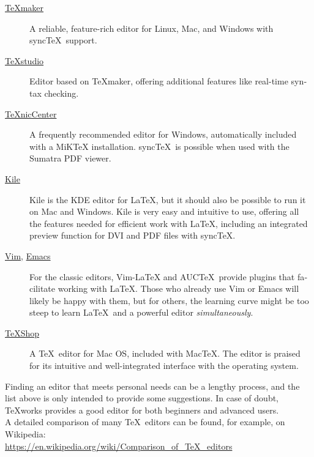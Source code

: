 \documentclass[
	ausgabe=2024-02-12,
	titel=Installation\ Instructions,
	shortverb=true,
	englisch=true,
]{../tex/latexkurs-exercise}
\begin{document}
\begin{english}
\begin{description}
\item[\href{https://www.xm1math.net/texmaker/}{TeXmaker}]
A reliable, feature-rich editor for Linux, Mac, and Windows with sync\TeX\ support.

\item[\href{https://www.texstudio.org/}{TeXstudio}]
Editor based on TeXmaker, offering additional features like real-time syntax checking.

\item[\href{https://www.texniccenter.org/}{TeXnicCenter}]
A frequently recommended editor for Windows, automatically included with a MiKTeX installation. sync\TeX\ is possible when used with the Sumatra PDF viewer.

\item[\href{https://kile.sourceforge.io/}{Kile}]
Kile is the KDE editor for \LaTeX, but it should also be possible to run it on Mac and Windows. Kile is very easy and intuitive to use, offering all the features needed for efficient work with \LaTeX, including an integrated preview function for DVI and PDF files with sync\TeX.

\item[\href{https://www.vim.org/}{Vim}, \href{https://www.gnu.org/software/emacs}{Emacs}]
For the classic editors, Vim-LaTeX and AUC\TeX\ provide plugins that facilitate working with \LaTeX. Those who already use Vim or Emacs will likely be happy with them, but for others, the learning curve might be too steep to learn \LaTeX\ and a powerful editor \emph{simultaneously}.

\item[\href{https://pages.uoregon.edu/koch/texshop}{TeXShop}]
A \TeX\ editor for Mac OS, included with Mac\TeX. The editor is praised for its intuitive and well-integrated interface with the operating system.
\end{description}

\noindent Finding an editor that meets personal needs can be a lengthy process, and the list above is only intended to provide some suggestions. In case of doubt, TeXworks provides a good editor for both beginners and advanced users.\\
A detailed comparison of many \TeX\ editors can be found, for example, on Wikipedia:\\\url{https://en.wikipedia.org/wiki/Comparison_of_TeX_editors}


\end{english}
\end{document}
